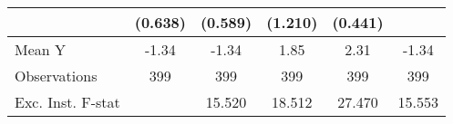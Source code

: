 {\begin{tabular}{l*{5}{c}}
            &     (0.638)         &     (0.589)         &     (1.210)         &     (0.441)         &                     \\
\midrule
Mean Y      &       -1.34         &       -1.34         &        1.85         &        2.31         &       -1.34         \\
Observations&         399         &         399         &         399         &         399         &         399         \\
Exc. Inst. F-stat&                     &      15.520         &      18.512         &      27.470         &      15.553         \\
\bottomrule
\end{tabular}
}
